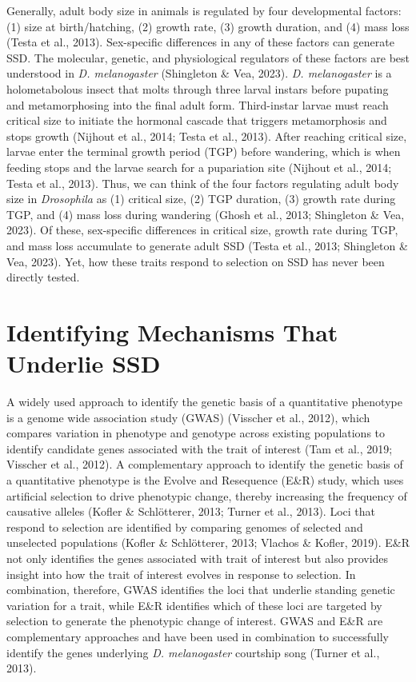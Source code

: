 \documentclass[12pt,reqno,oneside]{report}
\begin{document}
Generally, adult body size in animals is regulated by four developmental factors: (1) size at birth/hatching, (2) growth rate, (3) growth duration, and (4) mass loss (Testa et al., 2013). Sex-specific differences in any of these factors can generate SSD. The molecular, genetic, and physiological regulators  of these factors are best understood in \textit{D. melanogaster} (Shingleton \& Vea, 2023). \textit{D. melanogaster} is a holometabolous insect that molts through three larval instars before pupating and metamorphosing into the final adult form. Third-instar larvae must reach critical size to initiate the hormonal cascade that triggers metamorphosis and stops growth (Nijhout et al., 2014; Testa et al., 2013). After reaching critical size, larvae enter the terminal growth period (TGP) before wandering, which is when feeding stops and the larvae search for a pupariation site (Nijhout et al., 2014; Testa et al., 2013). Thus, we can think of the four factors regulating adult body size in \textit{Drosophila} as (1) critical size, (2) TGP duration, (3) growth rate during TGP, and (4) mass loss during wandering (Ghosh et al., 2013; Shingleton \& Vea, 2023). Of these, sex-specific differences in critical size, growth rate during TGP, and mass loss accumulate to generate adult SSD (Testa et al., 2013; Shingleton \& Vea, 2023). Yet, how these traits respond to selection on SSD has never been directly tested.

\section{Identifying Mechanisms That Underlie SSD}

A widely used approach to identify the genetic basis of a quantitative phenotype is a genome wide association study (GWAS) (Visscher et al., 2012), which compares variation in phenotype and genotype across existing populations to identify candidate genes associated with the trait of interest (Tam et al., 2019; Visscher et al., 2012). A complementary approach to identify the genetic basis of a quantitative phenotype is the Evolve and Resequence (E\&R) study, which uses artificial selection to drive phenotypic change, thereby increasing the frequency of causative alleles (Kofler \& Schlötterer, 2013; Turner et al., 2013). Loci that respond to selection are identified by comparing genomes of selected and unselected populations (Kofler \& Schlötterer, 2013; Vlachos \& Kofler, 2019). E\&R not only identifies the genes associated with trait of interest but also provides insight into how the trait of interest evolves in response to selection. In combination, therefore, GWAS identifies the loci that underlie standing genetic variation for a trait, while E\&R identifies which of these loci are targeted by selection to generate the phenotypic change of interest. GWAS and E\&R are complementary approaches and have been used in combination to successfully identify the genes underlying \textit{D. melanogaster} courtship song (Turner et al., 2013).
\end{document}
